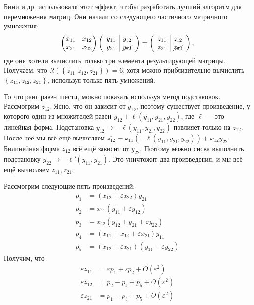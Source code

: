 Бини и др. \cite{Bini} использовали этот эффект, чтобы разработать лучший алгоритм для перемножения матриц. Они начали со следующего частичного матричного умножения:
\[
	\begin{pmatrix}
	  x_{11} & x_{12}\\
	  x_{21} & x_{22} 
	\end{pmatrix}
	\left( 
	\begin{array}{c|c}
	  y_{11} & y_{12}\\
	  y_{21} & \cancel{y_{22}}
	\end{array}
	 \right)
	 =
	 \left( 
	\begin{array}{c|c}
	  z_{11} & z_{12}\\
	  z_{21} & \cancel{z_{22}}
	\end{array}
	 \right),
\]
где они хотели вычислить только три элемента результирующей матрицы. Получаем, что $R(\left\{ z_{11}, z_{12}, z_{21} \right\})=6$, хотя можно приблизительно вычислить $\left\{ z_{11}, z_{12}, z_{21} \right\}$, используя только пять умножений.

То что ранг равен шести, можно показать используя метод подстановок. Рассмотрим $z_{12}$. Ясно, что он зависит от $y_{12}$, поэтому существует произведение, у которого один из множителей равен $y_{12} + \ell(y_{11}, y_{21}, y_{22})$, где $\ell$ --- это линейная форма. Подстановка $y_{12} \to -\ell(y_{11}, y_{21}, y_{22})$ повлияет только на $z_{12}$. После неё мы всё ещё вычисляем $\overline{z_{12}}=x_{11}(-\ell(y_{11},y_{21},y_{22})) + x_{12}y_{22}$. Билинейная форма $\overline{z_{12}}$ всё ещё зависит от $y_{22}$. Поэтому можно снова выполнить подстановку $y_{22} \to -\ell'(y_{11}, y_{21})$. Это уничтожит два произведения, и мы всё ещё вычисляем $z_{11},z_{21}$.

Рассмотрим следующие пять произведений:
\begin{align*}
  p_1 & = (x_{12} + \varepsilon x_{22})   y_{21}\\
  p_2 & = x_{11} (y_{11} + \varepsilon y_{12})\\
  p_3 & = x_{12} (y_{12} + y_{21} + \varepsilon y_{22})\\
  p_4 & = (x_{11} + x_{12} + \varepsilon x_{21}) y_{11}\\
  p_5 & = (x_{12} + \varepsilon x_{21}) (y_{11} + \varepsilon y_{22})
\end{align*}
Получим, что
\begin{align*}
  \varepsilon z_{11}   & = \varepsilon p_1 + \varepsilon p_2 + O(\varepsilon^2)\\
  \varepsilon z_{12} & = p_2 - p_4 + p_5 + O(\varepsilon^2)\\
  \varepsilon z_{21} & = p_1 - p_3 + p_5 + O(\varepsilon^2)
\end{align*}

